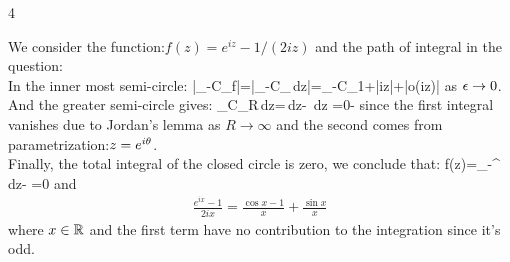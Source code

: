 \begin{vv286_ms}{4}
\item[]
	We consider the
	function:$f(z)=e^{iz}-1/(2iz)$
	and the path of integral in the question:\\
	In the inner most semi-circle:
	\eq
	{
	\left|\int_{-C_{\e}}f\right|=\left|\int_{-C_{\e}}\,dz\right|=\int_{-C_{\e}}1+|iz|+|o(iz)|
	\le{}
	}
	as $\epsilon\to0$.\\
	And the greater semi-circle gives:
	\eq
	{
	\int_{C_{R}}\,dz=\int{}\,dz-
	\int{}\,dz
	=0-
	}
	since the first integral vanishes due to Jordan's
	lemma as $R\to\infty$ and the second comes from
	parametrization:$z=e^{i\theta}$.\\
	Finally, the total integral of the closed circle is
	zero, we conclude that:
	\eq
	{
	\oint
	f(z)=\int_{-\infty}^{\infty}\,dz-
	=0
	}
	and 
	\begin{align*}
		\frac{e^{ix}-1}{2ix}=\frac{\cos x-1}{x}+\frac{\sin x}{x}
	\end{align*}
	where $x\in\mathbb{R}$ and the first term have no
	contribution to the integration since it's odd.
\end{vv286_ms}

